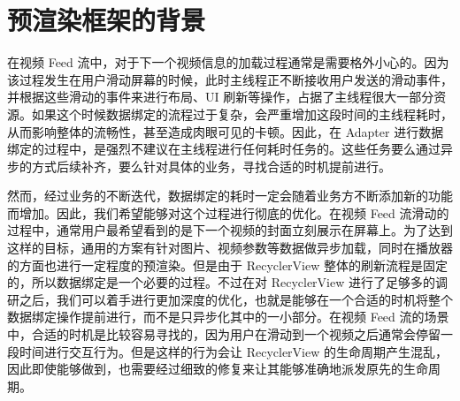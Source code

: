 \chapter{预渲染框架的背景}

在视频 Feed 流中，对于下一个视频信息的加载过程通常是需要格外小心的。因为该过程发生在用户滑动屏幕的时候，此时主线程正不断接收用户发送的滑动事件，并根据这些滑动的事件来进行布局、UI 刷新等操作，占据了主线程很大一部分资源。如果这个时候数据绑定的流程过于复杂，会严重增加这段时间的主线程耗时，从而影响整体的流畅性，甚至造成肉眼可见的卡顿。因此，在 Adapter 进行数据绑定的过程中，是强烈不建议在主线程进行任何耗时任务的。这些任务要么通过异步的方式后续补齐，要么针对具体的业务，寻找合适的时机提前进行。

然而，经过业务的不断迭代，数据绑定的耗时一定会随着业务方不断添加新的功能而增加。因此，我们希望能够对这个过程进行彻底的优化。在视频 Feed 流滑动的过程中，通常用户最希望看到的是下一个视频的封面立刻展示在屏幕上。为了达到这样的目标，通用的方案有针对图片、视频参数等数据做异步加载，同时在播放器的方面也进行一定程度的预渲染。但是由于 RecyclerView 整体的刷新流程是固定的，所以数据绑定是一个必要的过程。不过在对 RecyclerView 进行了足够多的调研之后，我们可以着手进行更加深度的优化，也就是能够在一个合适的时机将整个数据绑定操作提前进行，而不是只异步化其中的一小部分。在视频 Feed 流的场景中，合适的时机是比较容易寻找的，因为用户在滑动到一个视频之后通常会停留一段时间进行交互行为。但是这样的行为会让 RecyclerView 的生命周期产生混乱，因此即使能够做到，也需要经过细致的修复来让其能够准确地派发原先的生命周期。